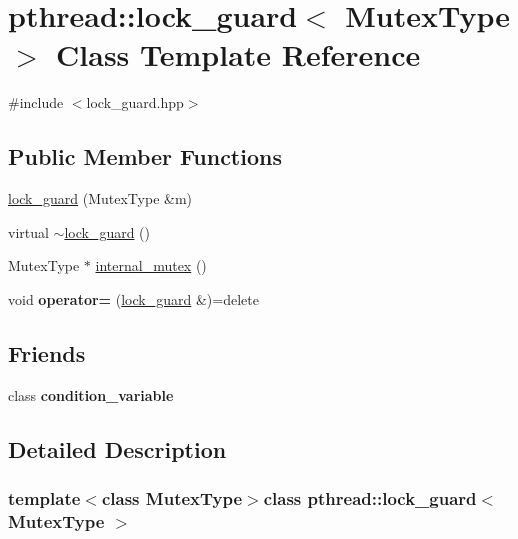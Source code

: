 \hypertarget{classpthread_1_1lock__guard}{}\section{pthread\+:\+:lock\+\_\+guard$<$ Mutex\+Type $>$ Class Template Reference}
\label{classpthread_1_1lock__guard}


{\ttfamily \#include $<$lock\+\_\+guard.\+hpp$>$}

\subsection*{Public Member Functions}
\begin{DoxyCompactItemize}
\item 
\hyperlink{classpthread_1_1lock__guard_a5298f98a23bc7d7fe4fc9636f989ad65}{lock\+\_\+guard} (Mutex\+Type \&m)
\item 
virtual \hyperlink{classpthread_1_1lock__guard_a939eb7ef1b1b53d9603734fc6b120f76}{$\sim$lock\+\_\+guard} ()
\item 
Mutex\+Type $\ast$ \hyperlink{classpthread_1_1lock__guard_a0aeeee216e7b322845678cf59990351b}{internal\+\_\+mutex} ()
\item 
\hypertarget{classpthread_1_1lock__guard_a1f9ab705f7ffe9eb8739ff3cf34cf7f2}{}void {\bfseries operator=} (\hyperlink{classpthread_1_1lock__guard}{lock\+\_\+guard} \&)=delete\label{classpthread_1_1lock__guard_a1f9ab705f7ffe9eb8739ff3cf34cf7f2}

\end{DoxyCompactItemize}
\subsection*{Friends}
\begin{DoxyCompactItemize}
\item 
\hypertarget{classpthread_1_1lock__guard_a89c9b6aa2256fa5efd92a333d96381d4}{}class {\bfseries condition\+\_\+variable}\label{classpthread_1_1lock__guard_a89c9b6aa2256fa5efd92a333d96381d4}

\end{DoxyCompactItemize}


\subsection{Detailed Description}
\subsubsection*{template$<$class Mutex\+Type$>$class pthread\+::lock\+\_\+guard$<$ Mutex\+Type $>$}

